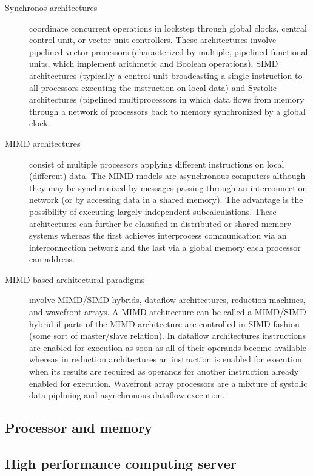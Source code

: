 \begin{description}
\item[Synchronos architectures] coordinate concurrent operations in
  lockstep through global clocks, central control unit, or vector unit
  controllers. These architectures involve pipelined vector processors
  (characterized by multiple, pipelined functional units, which
  implement arithmetic and Boolean operations), SIMD architectures
  (typically a control unit broadcasting a single instruction to
  all processors executing the instruction on local data) and Systolic
  architectures (pipelined multiprocessors in which data flows from
  memory through a network of processors back to memory synchronized
  by a global clock. 
\item[MIMD architectures] consist of multiple processors applying
  different instructions on local (different) data. The MIMD models
  are asynchronous computers although they may be synchronized by
  messages passing through an interconnection network (or by accessing
  data in a shared memory). The advantage is the possibility of
  executing largely independent subcalculations. These architectures
  can further be classified in distributed or shared memory systems
  whereas the first achieves interprocess communication via an
  interconnection network and the last via a global memory each
  processor can address.
\item[MIMD-based architectural paradigms] involve MIMD/SIMD hybrids,
  dataflow architectures, reduction machines, and wavefront arrays. A
  MIMD architecture can be called a MIMD/SIMD hybrid if parts of the
  MIMD architecture are controlled in SIMD fashion (some sort of
  master/slave relation). In dataflow architectures instructions are
  enabled for execution as soon as all of their operands become
  available whereas in reduction architectures an instruction is
  enabled for execution when its results are required as operands for
  another instruction already enabled for execution. Wavefront array
  processors are a mixture of systolic data piplining and asynchronous
  dataflow execution.
\end{description}

\subsection{Processor and memory}



\subsection{High performance computing server}

